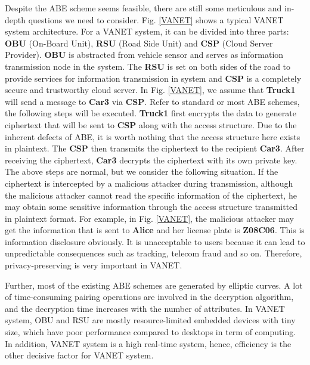 \documentclass[smallextended]{svjour3}       %
\begin{document}
	Despite the ABE scheme seems feasible, there are still some meticulous and in-depth questions we need to consider.
	Fig. \ref{VANET} shows a typical VANET system architecture.
	For a VANET system, it can be divided into three parts: \textbf{OBU} (On-Board Unit), \textbf{RSU} (Road Side Unit) and \textbf{CSP} (Cloud Server Provider).
	\textbf{OBU} is abstracted from vehicle sensor and serves as information transmission node in the system.
	The \textbf{RSU} is set on both sides of the road to provide services for information transmission in system and \textbf{CSP} is a completely secure and trustworthy cloud server.
	In Fig. \ref{VANET}, we assume that \textbf{Truck1} will send a message to \textbf{Car3} via \textbf{CSP}.
	Refer to standard or most ABE schemes, the following steps will be executed.
	\textbf{Truck1} first encrypts the data to generate ciphertext that will be sent to \textbf{CSP} along with the access structure.
	Due to the inherent defects of ABE, it is worth nothing that the access structure here exists in plaintext.
	The \textbf{CSP} then transmits the ciphertext to the recipient \textbf{Car3}. 
	After receiving the ciphertext, \textbf{Car3} decrypts the ciphertext with its own private key.
	The above steps are normal, but we consider the following situation.
	If the ciphertext is intercepted by a malicious attacker during transmission, although the malicious attacker cannot read the specific information of the ciphertext, he may obtain some sensitive information through the access structure transmitted in plaintext format.
	For example, in Fig. \ref{VANET}, the malicious attacker may get the information that is sent to \textbf{Alice} and her license plate is \textbf{Z08C06}.
	This is information disclosure obviously.
	It is unacceptable to users because it can lead to unpredictable consequences such as tracking, telecom fraud and so on. 
	Therefore, privacy-preserving is very important in VANET.

	Further, most of the existing ABE schemes are generated by elliptic curves.
	A lot of time-consuming pairing operations are involved in the decryption algorithm, and the decryption time increases with the number of attributes.
	In VANET system, OBU and RSU are mostly resource-limited embedded devices with tiny size, which have poor performance compared to desktops in term of computing.
	In addition, VANET system is a high real-time system, hence, efficiency is the other decisive factor for VANET system.
\end{document}
